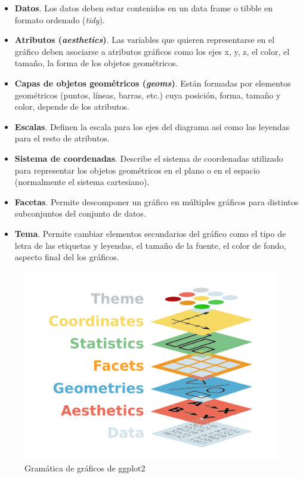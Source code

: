 \documentclass[
  a4paper,
]{scrreport}
\providecommand{\tightlist}{%
  \setlength{\itemsep}{0pt}\setlength{\parskip}{0pt}}\usepackage{longtable,booktabs,array}
\theoremstyle{definition}
\theoremstyle{definition}
\theoremstyle{remark}
\begin{document}
\begin{itemize}
\tightlist
\item
  \textbf{Datos}. Los datos deben estar contenidos en un data frame o
  tibble en formato ordenado (\emph{tidy}).
\item
  \textbf{Atributos (\emph{aesthetics})}. Las variables que quieren
  representarse en el gráfico deben asociarse a atributos gráficos como
  los ejes x, y, z, el color, el tamaño, la forma de los objetos
  geométricos.
\item
  \textbf{Capas de objetos geométricos (\emph{geoms})}. Están formadas
  por elementos geométricos (puntos, líneas, barras, etc.) cuya
  posición, forma, tamaño y color, depende de los atributos.
\item
  \textbf{Escalas}. Definen la escala para los ejes del diagrama así
  como las leyendas para el resto de atributos.
\item
  \textbf{Sistema de coordenadas}. Describe el sistema de coordenadas
  utilizado para representar los objetos geométricos en el plano o en el
  espacio (normalmente el sistema cartesiano).
\item
  \textbf{Facetas}. Permite descomponer un gráfico en múltiples gráficos
  para distintos subconjuntos del conjunto de datos.
\item
  \textbf{Tema}. Permite cambiar elementos secundarios del gráfico como
  el tipo de letra de las etiquetas y leyendas, el tamaño de la fuente,
  el color de fondo, aspecto final del los gráficos.
\end{itemize}

\begin{figure}

{\centering \includegraphics{img/graficos/ggplot-grammar-of-graphics.png}

}

\caption{Gramática de gráficos de ggplot2}

\end{figure}
\end{document}
